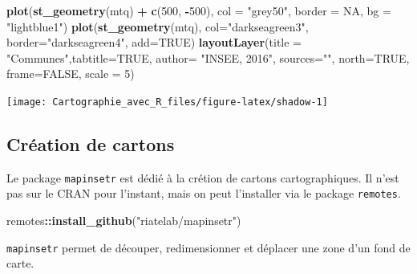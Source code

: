 \documentclass[]{book}
\newenvironment{Shaded}{\begin{snugshade}}{\end{snugshade}}
\newcommand{\KeywordTok}[1]{\textcolor[rgb]{0.13,0.29,0.53}{\textbf{#1}}}
\newcommand{\DataTypeTok}[1]{\textcolor[rgb]{0.13,0.29,0.53}{#1}}
\newcommand{\DecValTok}[1]{\textcolor[rgb]{0.00,0.00,0.81}{#1}}
\newcommand{\StringTok}[1]{\textcolor[rgb]{0.31,0.60,0.02}{#1}}
\newcommand{\OtherTok}[1]{\textcolor[rgb]{0.56,0.35,0.01}{#1}}
\newcommand{\OperatorTok}[1]{\textcolor[rgb]{0.81,0.36,0.00}{\textbf{#1}}}
\newcommand{\NormalTok}[1]{#1}
\begin{document}
\begin{Shaded}
\begin{Highlighting}[]
\KeywordTok{plot}\NormalTok{(}\KeywordTok{st_geometry}\NormalTok{(mtq) }\OperatorTok{+}\StringTok{ }\KeywordTok{c}\NormalTok{(}\DecValTok{500}\NormalTok{, }\OperatorTok{-}\DecValTok{500}\NormalTok{), }
     \DataTypeTok{col =} \StringTok{"grey50"}\NormalTok{, }\DataTypeTok{border =} \OtherTok{NA}\NormalTok{, }\DataTypeTok{bg =} \StringTok{"lightblue1"}\NormalTok{)}
\KeywordTok{plot}\NormalTok{(}\KeywordTok{st_geometry}\NormalTok{(mtq), }\DataTypeTok{col=}\StringTok{"darkseagreen3"}\NormalTok{, }\DataTypeTok{border=}\StringTok{"darkseagreen4"}\NormalTok{, }\DataTypeTok{add=}\OtherTok{TRUE}\NormalTok{)}
\KeywordTok{layoutLayer}\NormalTok{(}\DataTypeTok{title =} \StringTok{"Communes"}\NormalTok{,}\DataTypeTok{tabtitle=}\OtherTok{TRUE}\NormalTok{,}
            \DataTypeTok{author=} \StringTok{"INSEE, 2016"}\NormalTok{, }\DataTypeTok{sources=}\StringTok{""}\NormalTok{, }\DataTypeTok{north=}\OtherTok{TRUE}\NormalTok{,  }
            \DataTypeTok{frame=}\OtherTok{FALSE}\NormalTok{, }\DataTypeTok{scale =} \DecValTok{5}\NormalTok{)}
\end{Highlighting}
\end{Shaded}

\begin{center}\texttt{[image: Cartographie\_avec\_R\_files/figure-latex/shadow-1]} \end{center}

\subsection{Création de cartons}\label{creation-de-cartons}

Le package \texttt{mapinsetr}\citep{R-mapinsetr} est dédié à la crétion
de cartons cartographiques. Il n'est pas sur le CRAN pour l'instant,
mais on peut l'installer via le package \texttt{remotes}.

\begin{Shaded}
\begin{Highlighting}[]
\NormalTok{remotes}\OperatorTok{::}\KeywordTok{install_github}\NormalTok{(}\StringTok{"riatelab/mapinsetr"}\NormalTok{)}
\end{Highlighting}
\end{Shaded}

\texttt{mapinsetr} permet de découper, redimensionner et déplacer une
zone d'un fond de carte.
\end{document}
